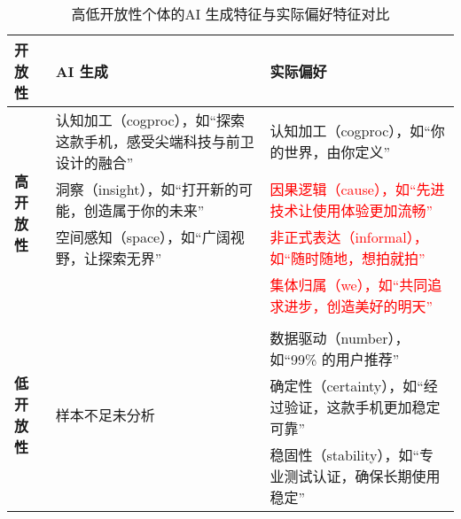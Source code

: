 \begin{table}[H]
\centering
\caption{\label{tab:study3_openness_comparison} 高低开放性个体的AI 生成特征与实际偏好特征对比}
{\tablesongti
\renewcommand{\arraystretch}{1.5} %
\begin{tabularx}{\linewidth}{l X X} %
    \toprule
    \textbf{开放性} & \textbf{AI 生成} & \textbf{实际偏好} \\
    \midrule
    \multirow{4}{*}{\textbf{高开放性}} 
    & 认知加工（cogproc），如“探索这款手机，感受尖端科技与前卫设计的融合” & 认知加工（cogproc），如“你的世界，由你定义” \\
    & 洞察（insight），如“打开新的可能，创造属于你的未来” & \textcolor{red}{因果逻辑（cause），如“先进技术让使用体验更加流畅”} \\
    & 空间感知（space），如“广阔视野，让探索无界” & \textcolor{red}{非正式表达（informal），如“随时随地，想拍就拍”} \\
    &  & \textcolor{red}{集体归属（we），如“共同追求进步，创造美好的明天”} \\
    \midrule
    \multirow{4}{*}{\textbf{低开放性}} 
    & \multirow{4}{*}{样本不足未分析}\\
    &  & 数据驱动（number），如“99\% 的用户推荐” \\
    &  & 确定性（certainty），如“经过验证，这款手机更加稳定可靠” \\
    &  & 稳固性（stability），如“专业测试认证，确保长期使用稳定” \\
    \bottomrule
\end{tabularx}
}
\end{table}


